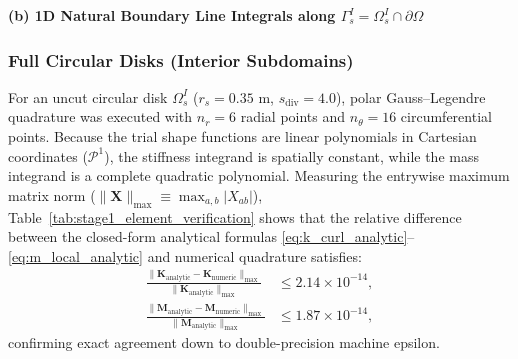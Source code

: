 \documentclass[VANCOUVER,Times1COL]{WileyNJD-v5}
\begin{document}
\begin{table}[!t]
    \vspace{0.8em}
    \textbf{(b) 1D Natural Boundary Line Integrals along $\Gamma_s^I = \Omega_s^I \cap \partial\Omega$}
    \vspace{0.2em}

\end{table}

\subsubsection{Full Circular Disks (Interior Subdomains)}
For an uncut circular disk $\Omega_s^I$ ($r_s = 0.35\text{ m}$, $s_{\mathrm{div}} = 4.0$), polar Gauss--Legendre quadrature was executed with $n_r = 6$ radial points and $n_\theta = 16$ circumferential points. Because the trial shape functions are linear polynomials in Cartesian coordinates ($\mathcal{P}^1$), the stiffness integrand is spatially constant, while the mass integrand is a complete quadratic polynomial. Measuring the entrywise maximum matrix norm ($\|\mathbf{X}\|_{\max} \equiv \max_{a,b} |X_{ab}|$), Table~\ref{tab:stage1_element_verification} shows that the relative difference between the closed-form analytical formulas \eqref{eq:k_curl_analytic}--\eqref{eq:m_local_analytic} and numerical quadrature satisfies:
\begin{align}
    \frac{\|\mathbf{K}_{\mathrm{analytic}} - \mathbf{K}_{\mathrm{numeric}}\|_{\max}}{\|\mathbf{K}_{\mathrm{analytic}}\|_{\max}} & \le 2.14 \times 10^{-14}, \\
    \frac{\|\mathbf{M}_{\mathrm{analytic}} - \mathbf{M}_{\mathrm{numeric}}\|_{\max}}{\|\mathbf{M}_{\mathrm{analytic}}\|_{\max}} & \le 1.87 \times 10^{-14},
\end{align}
confirming exact agreement down to double-precision machine epsilon.
\end{document}
